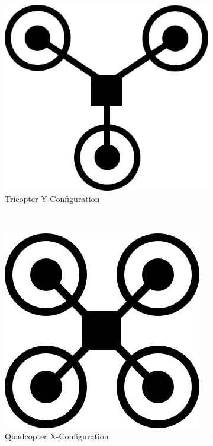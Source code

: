 \begin{figure}[b]
    \centering
    \begin{subfigure}[b]{0.3\textwidth}
        \centering
        \includegraphics[scale=0.4]{img/drone_yconfig}
        \caption{Tricopter Y-Configuration}
        \label{fig:tricopter-y}
    \end{subfigure}
    ~
    \begin{subfigure}[b]{0.3\textwidth}
        \centering
        \includegraphics[scale=0.4]{img/drone_xconfig}
        \caption{Quadcopter X-Configuration}
        \label{fig:quadcopter-x}
    \end{subfigure}
    ~
    \begin{subfigure}[b]{0.3\textwidth}
        \centering

\end{subfigure}
\end{figure}
